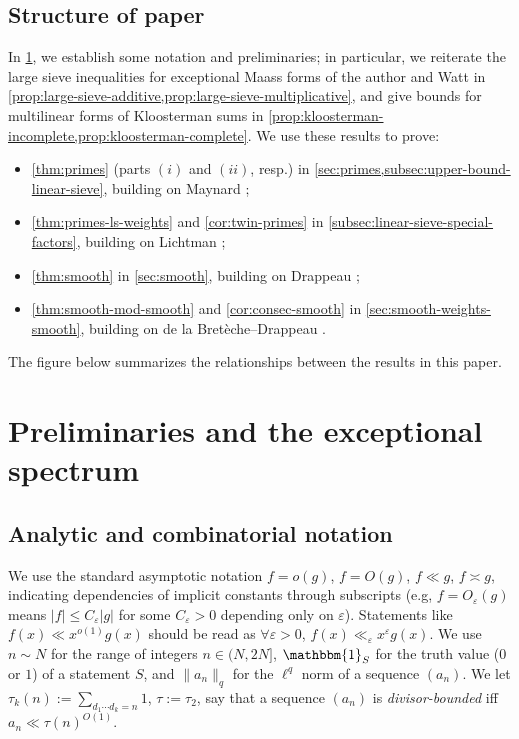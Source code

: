 \documentclass[reqno,11pt]{amsart}
\theoremstyle{remark}
\numberwithin{equation}{section}
\newcommand{\one}{\mathbbm{1}}
\newcommand{\eps}{\varepsilon}
\begin{document}
\subsection{Structure of paper}
In \cref{sec:preliminaries}, we establish some notation and preliminaries; in particular, we reiterate the large sieve inequalities for exceptional Maass forms of the author \cite[Theorem 3]{pascadi2024large} and Watt \cite[Theorem 2]{watt1995kloosterman} in \cref{prop:large-sieve-additive,prop:large-sieve-multiplicative}, and give bounds for multilinear forms of Kloosterman sums in \cref{prop:kloosterman-incomplete,prop:kloosterman-complete}. We use these results to prove:
\begin{itemize} 
    \item \cref{thm:primes} (parts $(i)$ and $(ii)$, resp.) in \cref{sec:primes,subsec:upper-bound-linear-sieve}, building on Maynard \cite{maynard2025primes2};
    \item \cref{thm:primes-ls-weights} and \cref{cor:twin-primes} in \cref{subsec:linear-sieve-special-factors}, building on Lichtman \cite{lichtman2023primes}; 
    \item \cref{thm:smooth} in \cref{sec:smooth}, building on Drappeau \cite{drappeau2015theoremes};
    \item \cref{thm:smooth-mod-smooth} and \cref{cor:consec-smooth} in \cref{sec:smooth-weights-smooth}, building on de la Bret\`eche--Drappeau \cite{de2020niveau}.
\end{itemize}
The figure below summarizes the relationships between the results in this paper.
\begin{figure}[omitted: a diagram of this paper's results, not reproduced here]\label{fig:structure}\end{figure}
\FloatBarrier



\section{Preliminaries and the exceptional spectrum} \label{sec:preliminaries}

\subsection{Analytic and combinatorial notation} \label{subsec:analytic-combinatorial}

We use the standard asymptotic notation $f = o(g)$, $f = O(g)$, $f \ll g$, $f \asymp g$, indicating dependencies of implicit constants through subscripts (e.g, $f = O_\eps(g)$ means $|f| \le C_\eps |g|$ for some $C_\eps > 0$ depending only on $\eps$). Statements like $f(x) \ll x^{o(1)} g(x)$ should be read as $\forall \eps > 0$, $f(x) \ll_\eps x^\eps g(x)$. We use $n \sim N$ for the range of integers $n \in (N, 2N]$, $\one_S$ for the truth value ($0$ or $1$) of a statement $S$, and $\|a_n\|_q$ for the $\ell^q$ norm of a sequence $(a_n)$. We let $\tau_k(n) := \sum_{d_1\cdots d_k = n} 1$, $\tau := \tau_2$, say that a sequence $(a_n)$ is \emph{divisor-bounded} iff $a_n \ll \tau(n)^{O(1)}$.
\end{document}
